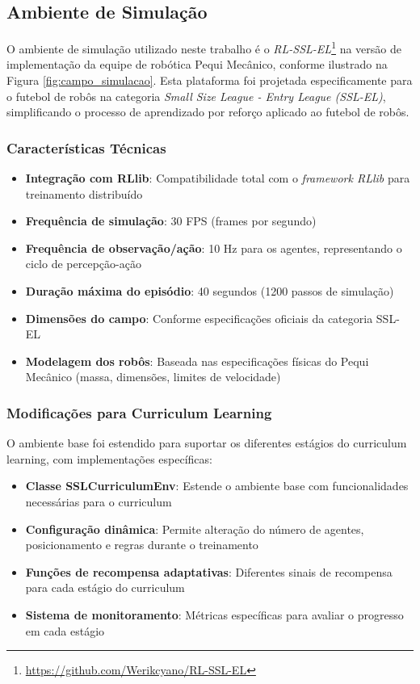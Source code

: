 \subsection{Ambiente de Simulação}

O ambiente de simulação utilizado neste trabalho é o \textit{RL-SSL-EL}\footnote{\url{https://github.com/Werikcyano/RL-SSL-EL}} na versão de implementação da equipe de robótica Pequi Mecânico, conforme ilustrado na Figura \ref{fig:campo_simulacao}. Esta plataforma foi projetada especificamente para o futebol de robôs na categoria \textit{Small Size League - Entry League (SSL-EL)}, simplificando o processo de aprendizado por reforço aplicado ao futebol de robôs.

\subsubsection{Características Técnicas}

\begin{itemize}
    \item \textbf{Integração com RLlib}: Compatibilidade total com o \textit{framework RLlib} para treinamento distribuído
    \item \textbf{Frequência de simulação}: 30 FPS (frames por segundo)
    \item \textbf{Frequência de observação/ação}: 10 Hz para os agentes, representando o ciclo de percepção-ação
    \item \textbf{Duração máxima do episódio}: 40 segundos (1200 passos de simulação)
    \item \textbf{Dimensões do campo}: Conforme especificações oficiais da categoria SSL-EL
    \item \textbf{Modelagem dos robôs}: Baseada nas especificações físicas do Pequi Mecânico (massa, dimensões, limites de velocidade)
\end{itemize}

\subsubsection{Modificações para Curriculum Learning}

O ambiente base foi estendido para suportar os diferentes estágios do curriculum learning, com implementações específicas:

\begin{itemize}
    \item \textbf{Classe SSLCurriculumEnv}: Estende o ambiente base com funcionalidades necessárias para o curriculum
    \item \textbf{Configuração dinâmica}: Permite alteração do número de agentes, posicionamento e regras durante o treinamento
    \item \textbf{Funções de recompensa adaptativas}: Diferentes sinais de recompensa para cada estágio do curriculum
    \item \textbf{Sistema de monitoramento}: Métricas específicas para avaliar o progresso em cada estágio
\end{itemize}

